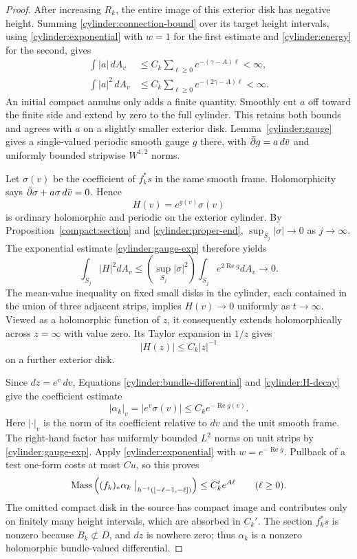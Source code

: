 \begin{proof}
After increasing $R_k$, the entire image of this exterior disk has
negative height.  Summing \eqref{cylinder:connection-bound} over its
target height intervals, using \eqref{cylinder:exponential} with
$w=1$ for the first estimate and \eqref{cylinder:energy} for the
second, gives
\begin{align*}
 \int |a|\,dA_v
   &\leq C_k\sum_{\ell\geq0}e^{-(\gamma-A)\ell}<\infty,\\
 \int |a|^2\,dA_v
   &\leq C_k\sum_{\ell\geq0}e^{-(2\gamma-A)\ell}<\infty.
\end{align*}
An initial compact annulus only adds a finite quantity.  Smoothly
cut $a$ off toward the finite side and extend by zero to the full
cylinder.  This retains both bounds and agrees with $a$ on a
slightly smaller exterior disk.  Lemma~\ref{cylinder:gauge} gives
a single-valued periodic smooth gauge $g$ there, with
$\bar\partial g=a\,d\bar v$ and uniformly bounded stripwise
$W^{1,2}$ norms.

Let $\sigma(v)$ be the coefficient of $f_k^*s$ in the same smooth
frame.  Holomorphicity says $\bar\partial\sigma+a\sigma\,d\bar v=0$.
Hence
\[
 H(v)=e^{g(v)}\sigma(v)
\]
is ordinary holomorphic and periodic on the exterior cylinder.
By Proposition~\ref{compact:section} and \eqref{cylinder:proper-end},
$\sup_{S_j}|\sigma|\to0$ as $j\to\infty$.  The exponential
estimate \eqref{cylinder:gauge-exp} therefore yields
\[
 \int_{S_j}|H|^2dA_v
 \leq\left(\sup_{S_j}|\sigma|^2\right)
                    \int_{S_j}e^{2\operatorname{Re}g}dA_v
       \longrightarrow0.
\]
The mean-value inequality on fixed small disks in the cylinder,
each contained in the union of three adjacent strips, implies
$H(v)\to0$ uniformly as $t\to\infty$.  Viewed as a holomorphic
function of $z$, it consequently extends holomorphically across
$z=\infty$ with value zero.  Its Taylor expansion in $1/z$ gives
\begin{equation}\label{cylinder:H-decay}
 |H(z)|\leq C_k|z|^{-1}
\end{equation}
on a further exterior disk.

Since $dz=e^v\,dv$, Equations \eqref{cylinder:bundle-differential}
and \eqref{cylinder:H-decay} give the coefficient estimate
\[
 |\alpha_k|_v=|e^v\sigma(v)|
        \leq C_k e^{-\operatorname{Re}g(v)}.
\]
Here $|\cdot|_v$ is the norm of its coefficient relative to $dv$
and the unit smooth frame.  The right-hand factor has uniformly
bounded $L^2$ norms on unit strips by
\eqref{cylinder:gauge-exp}.  Apply
\eqref{cylinder:exponential} with
$w=e^{-\operatorname{Re}g}$.  Pullback of a test one-form costs at
most $Cu$, so this proves
\begin{equation}\label{cylinder:current-growth}
 \operatorname{Mass}\left((f_k)_*\alpha_k\bigm|_{h^{-1}([-\ell-1,-\ell])}\right)
          \leq C_k'e^{A\ell}\qquad(\ell\geq0).
\end{equation}
The omitted compact disk in the source has compact image and
contributes only on finitely many height intervals, which are
absorbed in $C_k'$.  The section $f_k^*s$ is nonzero because
$B_k\not\subset D$, and $dz$ is nowhere zero; thus $\alpha_k$ is a
nonzero holomorphic bundle-valued differential.


\end{proof}
